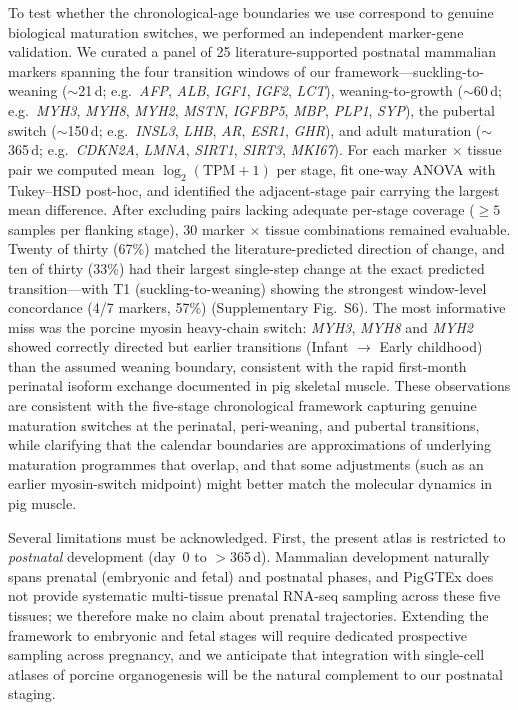 \documentclass[10pt,a4paper]{article}
\begin{document}
To test whether the chronological-age boundaries we use correspond to genuine biological maturation switches, we performed an independent marker-gene validation. We curated a panel of 25 literature-supported postnatal mammalian markers spanning the four transition windows of our framework---suckling-to-weaning ($\sim$21\,d; e.g.\ \textit{AFP}, \textit{ALB}, \textit{IGF1}, \textit{IGF2}, \textit{LCT}), weaning-to-growth ($\sim$60\,d; e.g.\ \textit{MYH3}, \textit{MYH8}, \textit{MYH2}, \textit{MSTN}, \textit{IGFBP5}, \textit{MBP}, \textit{PLP1}, \textit{SYP}), the pubertal switch ($\sim$150\,d; e.g.\ \textit{INSL3}, \textit{LHB}, \textit{AR}, \textit{ESR1}, \textit{GHR}), and adult maturation ($\sim$365\,d; e.g.\ \textit{CDKN2A}, \textit{LMNA}, \textit{SIRT1}, \textit{SIRT3}, \textit{MKI67}). For each marker $\times$ tissue pair we computed mean $\log_2(\mathrm{TPM}+1)$ per stage, fit one-way ANOVA with Tukey--HSD post-hoc, and identified the adjacent-stage pair carrying the largest mean difference. After excluding pairs lacking adequate per-stage coverage ($\geq 5$ samples per flanking stage), 30 marker $\times$ tissue combinations remained evaluable. Twenty of thirty (67\%) matched the literature-predicted direction of change, and ten of thirty (33\%) had their largest single-step change at the exact predicted transition---with T1 (suckling-to-weaning) showing the strongest window-level concordance (4/7 markers, 57\%) (Supplementary Fig.~S6). The most informative miss was the porcine myosin heavy-chain switch: \textit{MYH3}, \textit{MYH8} and \textit{MYH2} showed correctly directed but earlier transitions (Infant $\to$ Early childhood) than the assumed weaning boundary, consistent with the rapid first-month perinatal isoform exchange documented in pig skeletal muscle. These observations are consistent with the five-stage chronological framework capturing genuine maturation switches at the perinatal, peri-weaning, and pubertal transitions, while clarifying that the calendar boundaries are approximations of underlying maturation programmes that overlap, and that some adjustments (such as an earlier myosin-switch midpoint) might better match the molecular dynamics in pig muscle.

Several limitations must be acknowledged. First, the present atlas is restricted to \emph{postnatal} development (day~0 to $>$365\,d). Mammalian development naturally spans prenatal (embryonic and fetal) and postnatal phases, and PigGTEx does not provide systematic multi-tissue prenatal RNA-seq sampling across these five tissues; we therefore make no claim about prenatal trajectories. Extending the framework to embryonic and fetal stages will require dedicated prospective sampling across pregnancy, and we anticipate that integration with single-cell atlases of porcine organogenesis will be the natural complement to our postnatal staging.
\end{document}
